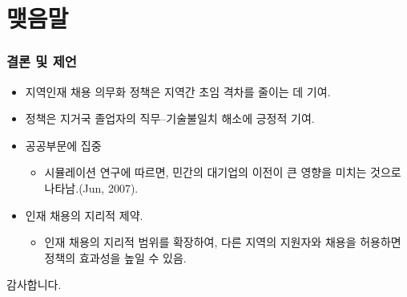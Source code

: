 \documentclass[aspectratio=169,xcolor=dvipsnames,handout]{beamer}
\begin{document}
\section{맺음말}%
\begin{frame}
    \frametitle{결론 및 제언}
    \begin{itemize}[<+->]
        \item 지역인재 채용 의무화 정책은 지역간 초임 격차를 줄이는 데 기여.
        \item 정책은 지거국 졸업자의 직무--기술불일치 해소에 긍정적 기여.
        \item 공공부문에 집중
        \begin{itemize}
            \item 시뮬레이션 연구에 따르면, 민간의 대기업의 이전이 큰 영향을 미치는 것으로 나타남.(Jun, 2007).
        \end{itemize}
        \item 인재 채용의 지리적 제약.
        \begin{itemize}
            \item 인재 채용의 지리적 범위를 확장하여, 다른 지역의 지원자와 채용을 허용하면 정책의 효과성을 높일 수 있음.
        \end{itemize}
    \end{itemize}
\end{frame}

\begin{frame}
    \centering
    \huge
    감사합니다.
\end{frame}


\end{document}
